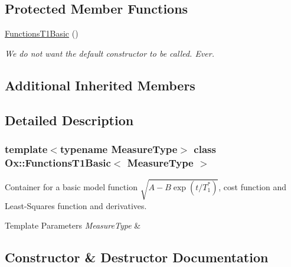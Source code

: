 \subsection*{Protected Member Functions}
\begin{DoxyCompactItemize}
\item 
\mbox{\label{class_ox_1_1_functions_t1_basic_ac6ddf49f7adb6415fa3f4f1df291b06d}} 
\mbox{\hyperlink{class_ox_1_1_functions_t1_basic_ac6ddf49f7adb6415fa3f4f1df291b06d}{Functions\+T1\+Basic}} ()
\begin{DoxyCompactList}\small\item\em We do not want the default constructor to be called. Ever. \end{DoxyCompactList}\end{DoxyCompactItemize}
\subsection*{Additional Inherited Members}


\subsection{Detailed Description}
\subsubsection*{template$<$typename Measure\+Type$>$\newline
class Ox\+::\+Functions\+T1\+Basic$<$ Measure\+Type $>$}

Container for a basic model function $\sqrt{A-B\exp(t/T_1^*)}$, cost function and Least-\/\+Squares function and derivatives. 


\begin{DoxyTemplParams}{Template Parameters}
{\em Measure\+Type} & \\
\hline
\end{DoxyTemplParams}


\subsection{Constructor \& Destructor Documentation}
\mbox{\label{class_ox_1_1_functions_t1_basic_aa7dc56ceda03a3f9b9263683ea0865e7}} 
